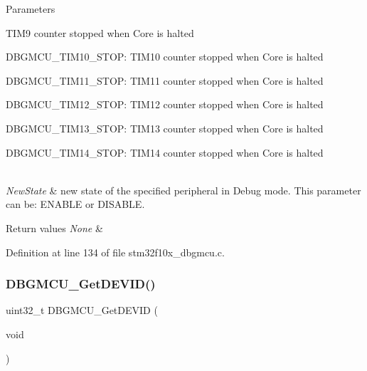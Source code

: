 \begin{DoxyParams}{Parameters}
\begin{DoxyItemize}
T\+I\+M9 counter stopped when Core is halted \item D\+B\+G\+M\+C\+U\+\_\+\+T\+I\+M10\+\_\+\+S\+T\+OP\+: T\+I\+M10 counter stopped when Core is halted \item D\+B\+G\+M\+C\+U\+\_\+\+T\+I\+M11\+\_\+\+S\+T\+OP\+: T\+I\+M11 counter stopped when Core is halted \item D\+B\+G\+M\+C\+U\+\_\+\+T\+I\+M12\+\_\+\+S\+T\+OP\+: T\+I\+M12 counter stopped when Core is halted \item D\+B\+G\+M\+C\+U\+\_\+\+T\+I\+M13\+\_\+\+S\+T\+OP\+: T\+I\+M13 counter stopped when Core is halted \item D\+B\+G\+M\+C\+U\+\_\+\+T\+I\+M14\+\_\+\+S\+T\+OP\+: T\+I\+M14 counter stopped when Core is halted \end{DoxyItemize}
\\
\hline
{\em New\+State} & new state of the specified peripheral in Debug mode. This parameter can be\+: E\+N\+A\+B\+LE or D\+I\+S\+A\+B\+LE. \\
\hline
\end{DoxyParams}

\begin{DoxyRetVals}{Return values}
{\em None} & \\
\hline
\end{DoxyRetVals}


Definition at line 134 of file stm32f10x\+\_\+dbgmcu.\+c.

\mbox{\label{group___d_b_g_m_c_u___exported___functions_gac34193c34dbce759bf424957a31b3266}} 
\subsubsection{\texorpdfstring{D\+B\+G\+M\+C\+U\+\_\+\+Get\+D\+E\+V\+I\+D()}{DBGMCU\_GetDEVID()}}
{\footnotesize\ttfamily uint32\+\_\+t D\+B\+G\+M\+C\+U\+\_\+\+Get\+D\+E\+V\+ID (\begin{DoxyParamCaption}\item[{void}]{ }\end{DoxyParamCaption})}



